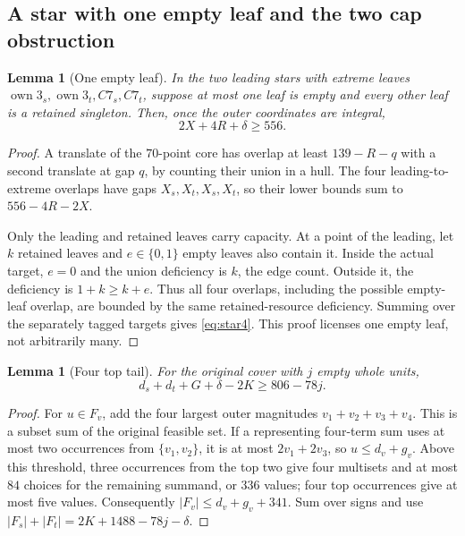 \documentclass[11pt,letterpaper]{article}
\newcommand{\card}[1]{\lvert#1\rvert}
\newcommand{\own}{\operatorname{own}}
\newtheorem{lemma}[theorem]{Lemma}
\theoremstyle{definition}\newtheorem{definition}[theorem]{Definition}
\begin{document}
\subsection{A star with one empty leaf and the two cap obstruction}
\begin{lemma}[One empty leaf]\label{lem:one-empty-leaf}
In the two leading stars with extreme leaves $\own3_s,\own3_t,C7_s,C7_t$, suppose at most one leaf is empty and every other leaf is a retained singleton. Then, once the outer coordinates are integral,
\begin{equation}\label{eq:star4}
2X+4R+\delta\ge556.
\end{equation}
\end{lemma}
\begin{proof}
A translate of the $70$-point core has overlap at least $139-R-q$ with a second translate at gap $q$, by counting their union in a hull. The four leading-to-extreme overlaps have gaps $X_s,X_t,X_s,X_t$, so their lower bounds sum to $556-4R-2X$.

Only the leading and retained leaves carry capacity. At a point of the leading, let $k$ retained leaves and $e\in\{0,1\}$ empty leaves also contain it. Inside the actual target, $e=0$ and the union deficiency is $k$, the edge count. Outside it, the deficiency is $1+k\ge k+e$. Thus all four overlaps, including the possible empty-leaf overlap, are bounded by the same retained-resource deficiency. Summing over the separately tagged targets gives \eqref{eq:star4}. This proof licenses one empty leaf, not arbitrarily many.
\end{proof}

\begin{lemma}[Four top tail]\label{lem:four-top-tail}
For the original cover with $j$ empty whole units,
\begin{equation}\label{eq:tail}
d_s+d_t+G+\delta-2K\ge806-78j.
\end{equation}
\end{lemma}
\begin{proof}
For $u\in F_v$, add the four largest outer magnitudes $v_1+v_2+v_3+v_4$. This is a subset sum of the original feasible set. If a representing four-term sum uses at most two occurrences from $\{v_1,v_2\}$, it is at most $2v_1+2v_3$, so $u\le d_v+g_v$. Above this threshold, three occurrences from the top two give four multisets and at most $84$ choices for the remaining summand, or $336$ values; four top occurrences give at most five values. Consequently $\card{F_v}\le d_v+g_v+341$. Sum over signs and use $\card{F_s}+\card{F_t}=2K+1488-78j-\delta$.
\end{proof}
\end{document}
